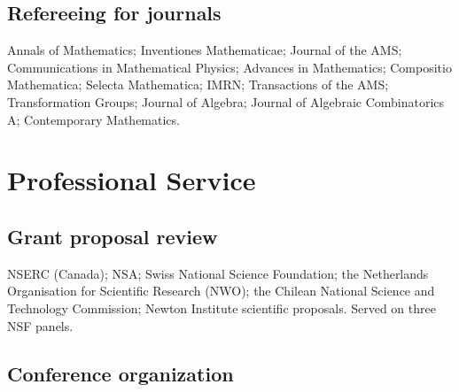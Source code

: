 \documentclass[11pt]{article}
\begin{document}
\subsection*{Refereeing for journals}

Annals of Mathematics; Inventiones Mathematicae; Journal of the AMS;
Communications in Mathematical Physics; Advances in Mathematics; Compositio
Mathematica; Selecta Mathematica; IMRN; Transactions of the AMS;
Transformation Groups; Journal of Algebra; Journal of Algebraic
Combinatorics A; Contemporary Mathematics.

\section{Professional Service}

\subsection*{Grant proposal review}

NSERC (Canada); NSA; Swiss National Science Foundation; the Netherlands
Organisation for Scientific Research (NWO); the Chilean National Science and
Technology Commission; Newton Institute scientific proposals. Served on three
NSF panels.

\subsection*{Conference organization}

\begin{cventries}
\end{cventries}

\end{document}
